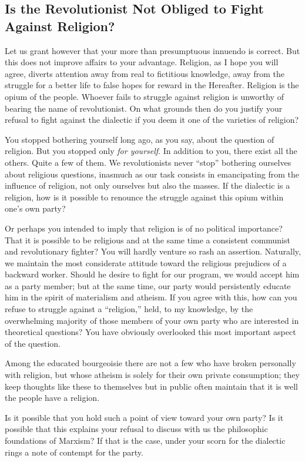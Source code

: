 \subsection*{Is the Revolutionist Not Obliged to Fight Against Religion?}

Let us grant however that your more than presumptuous innuendo is correct. But this does not improve affairs to your advantage. Religion, as I hope you will agree, diverts attention away from real to fictitious knowledge, away from the struggle for a better life to false hopes for reward in the Hereafter. Religion is the opium of the people. Whoever fails to struggle against religion is unworthy of bearing the name of revolutionist. On what grounds then do you justify your refusal to fight against the dialectic if you deem it one of the varieties of religion?

You stopped bothering yourself long ago, as you say, about the question of religion. But you stopped only \emph{for yourself}. In addition to you, there exist all the others. Quite a few of them. We revolutionists never “stop” bothering ourselves about religious questions, inasmuch as our task consists in emancipating from the influence of religion, not only ourselves but also the masses. If the dialectic is a religion, how is it possible to renounce the struggle against this opium within one’s own party?

Or perhaps you intended to imply that religion is of no political importance? That it is possible to be religious and at the same time a consistent communist and revolutionary fighter? You will hardly venture so rash an assertion. Naturally, we maintain the most considerate attitude toward the religious prejudices of a backward worker. Should he desire to fight for our program, we would accept him as a party member; but at the same time, our party would persistently educate him in the spirit of materialism and atheism. If you agree with this, how can you refuse to struggle against a “religion,” held, to my knowledge, by the overwhelming majority of those members of your own party who are interested in theoretical questions? You have obviously overlooked this most important aspect of the question.

Among the educated bourgeoisie there are not a few who have broken personally with religion, but whose atheism is solely for their own private consumption; they keep thoughts like these to themselves but in public often maintain that it is well the people have a religion.

Is it possible that you hold such a point of view toward your own party? Is it possible that this explains your refusal to discuss with us the philosophic foundations of Marxism? If that is the case, under your scorn for the dialectic rings a note of contempt for the party.

